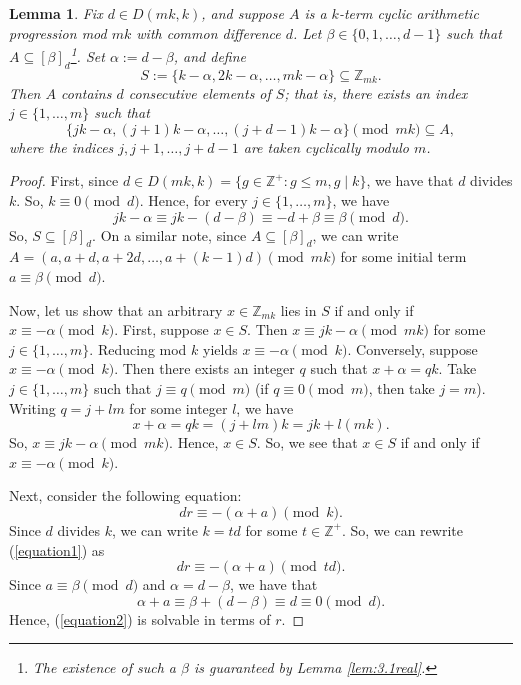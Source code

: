 \documentclass{article}
\newtheorem{lemma}[theorem]{Lemma}
\theoremstyle{definition}
\theoremstyle{remark}
\begin{document}
\begin{lemma}\label{lem:cons}
Fix $d \in D(mk,k)$, and suppose $A$ is a $k$-term cyclic arithmetic progression mod $mk$ with common difference $d$. Let $\beta \in \{0,1,\ldots,d-1\}$ such that $A \subseteq [\beta]_d$\footnote{The existence of such a $\beta$ is guaranteed by Lemma \ref{lem:3.1real}.}. Set $\alpha := d-\beta$, and define \[S := \{k-\alpha,2k-\alpha,\ldots,mk-\alpha\} \subseteq \mathbb{Z}_{mk}.\] Then $A$ contains $d$ consecutive elements of $S$; that is, there exists an index $j \in \{1,\ldots,m\}$ such that \[\{jk-\alpha,(j+1)k-\alpha,\ldots,(j+d-1)k-\alpha\} \pmod {mk} \subseteq A,\] where the indices $j,j+1,\ldots,j+d-1$ are taken cyclically modulo $m$.
\end{lemma}

\begin{proof}
    First, since $d \in D(mk,k) = \{g \in \mathbb{Z}^+ : g \leq m, g \mid k\}$, we have that $d$ divides $k$. So, $k \equiv 0 \pmod d$. Hence, for every $j \in \{1,\ldots,m\}$, we have \begin{equation*}
        jk -\alpha \equiv jk-(d-\beta) \equiv -d+\beta \equiv \beta \pmod d.
    \end{equation*} So, $S \subseteq [\beta]_d$. On a similar note, since $A \subseteq [\beta]_d$, we can write $A = (a,a+d,a+2d,\ldots,a+(k-1)d) \pmod {mk}$ for some initial term $a \equiv \beta \pmod d$.

    Now, let us show that an arbitrary $x \in \mathbb{Z}_{mk}$ lies in $S$ if and only if $x \equiv -\alpha \pmod k$. First, suppose $x \in S$. Then $x \equiv jk-\alpha \pmod {mk}$ for some $j \in \{1,\ldots,m\}$. Reducing mod $k$ yields $x \equiv -\alpha \pmod k$. Conversely, suppose $x \equiv -\alpha \pmod k$. Then there exists an integer $q$ such that $x+\alpha = qk$. Take $j \in \{1,\ldots,m\}$ such that $j \equiv q \pmod m$ (if $q \equiv 0 \pmod m$, then take $j=m$). Writing $q = j+lm$ for some integer $l$, we have \begin{equation*}
        x+\alpha = qk = (j+lm)k = jk+l(mk).
\end{equation*} So, $x \equiv jk-\alpha \pmod {mk}$. Hence, $x \in S$. So, we see that $x \in S$ if and only if $x \equiv -\alpha \pmod k$.

Next, consider the following equation:\begin{equation}\label{equation1}
    dr \equiv -(\alpha+a) \pmod k.
\end{equation} Since $d$ divides $k$, we can write $k=td$ for some $t \in \mathbb{Z}^+$. So, we can rewrite (\ref{equation1}) as \begin{equation}\label{equation2}
    dr \equiv -(\alpha + a) \pmod {td}.
\end{equation} Since $a \equiv \beta \pmod d$ and $\alpha = d-\beta$, we have that \begin{equation*}
    \alpha+a \equiv \beta +(d-\beta) \equiv d \equiv 0 \pmod d.
\end{equation*} Hence, (\ref{equation2}) is solvable in terms of $r$. 


\end{proof}
\end{document}
